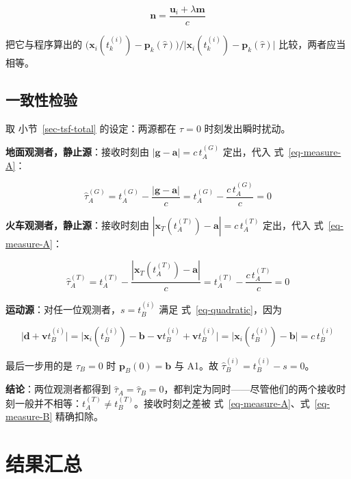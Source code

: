 \documentclass[
  chinese,
  a4paper,
  UTF8,
  12pt,
  oneside,
  openany]{ctexbook}
\theoremstyle{plain}
\theoremstyle{plain}
\theoremstyle{plain}
\theoremstyle{definition}
\theoremstyle{plain}
\theoremstyle{plain}
\theoremstyle{remark}
\begin{document}
\[
\mathbf{n}=\frac{\mathbf{u}_{i}+\lambda\mathbf{m}}{c}
\]

把它与程序算出的
\(\bigl(\mathbf{x}_{i}(t^{(i)}_{k})-\mathbf{p}_{k}(\widehat{\tau})\bigr)/\bigl|\mathbf{x}_{i}(t^{(i)}_{k})-\mathbf{p}_{k}(\widehat{\tau})\bigr|\)
比较，两者应当相等。

\subsection{一致性检验}\label{ux4e00ux81f4ux6027ux68c0ux9a8c}

取 小节~\ref{sec-tsf-total} 的设定：两源都在 \(\tau=0\)
时刻发出瞬时扰动。

\textbf{地面观测者，静止源}：接收时刻由
\(|\mathbf{g}-\mathbf{a}|=c\,t^{(G)}_{A}\) 定出，代入
式~\ref{eq-measure-A}：

\[
\widehat{\tau}^{(G)}_{A}=t^{(G)}_{A}-\frac{|\mathbf{g}-\mathbf{a}|}{c}=t^{(G)}_{A}-\frac{c\,t^{(G)}_{A}}{c}=0
\]

\textbf{火车观测者，静止源}：接收时刻由
\(|\mathbf{x}_{T}(t^{(T)}_{A})-\mathbf{a}|=c\,t^{(T)}_{A}\) 定出，代入
式~\ref{eq-measure-A}：

\[
\widehat{\tau}^{(T)}_{A}=t^{(T)}_{A}-\frac{|\mathbf{x}_{T}(t^{(T)}_{A})-\mathbf{a}|}{c}=t^{(T)}_{A}-\frac{c\,t^{(T)}_{A}}{c}=0
\]

\textbf{运动源}：对任一位观测者，\(s=t^{(i)}_{B}\) 满足
式~\ref{eq-quadratic}，因为

\[
\bigl|\mathbf{d}+\mathbf{v}t^{(i)}_{B}\bigr|
=\bigl|\mathbf{x}_{i}(t^{(i)}_{B})-\mathbf{b}-\mathbf{v}t^{(i)}_{B}+\mathbf{v}t^{(i)}_{B}\bigr|
=\bigl|\mathbf{x}_{i}(t^{(i)}_{B})-\mathbf{b}\bigr|
=c\,t^{(i)}_{B}
\]

最后一步用的是 \(\tau_{B}=0\) 时 \(\mathbf{p}_{B}(0)=\mathbf{b}\) 与
A1。故 \(\widehat{\tau}^{(i)}_{B}=t^{(i)}_{B}-s=0\)。

\textbf{结论}：两位观测者都得到
\(\widehat{\tau}_{A}=\widehat{\tau}_{B}=0\)，都判定为同时------尽管他们的两个接收时刻一般并不相等：\(t^{(T)}_{A}\neq t^{(T)}_{B}\)。接收时刻之差被
式~\ref{eq-measure-A}、式~\ref{eq-measure-B} 精确扣除。

\section{结果汇总}\label{sec-tsf-summary}
\end{document}
